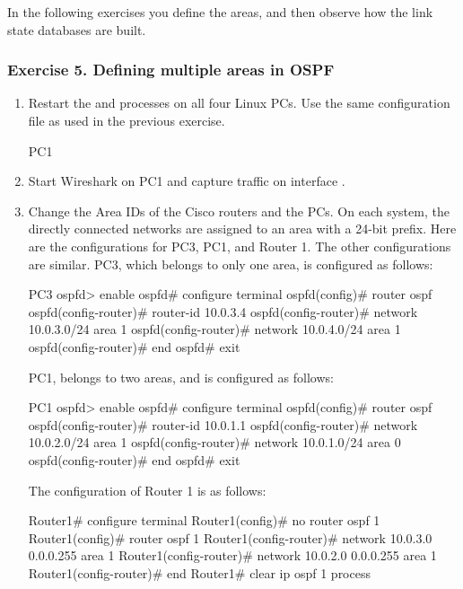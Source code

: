 In the following exercises you define the areas, and then observe how the link state databases are built.

\subsubsection*{Exercise 5. Defining multiple areas in OSPF}

\begin{enumerate}
	\item Restart the  and  processes on all four Linux PCs. Use the same  configuration file as used in the previous exercise.
		\begin{cmdblock}
	PC1%
		\end{cmdblock}
	\item Start Wireshark on PC1 and capture traffic on interface .
	\item Change the Area IDs of the Cisco routers and the PCs. On each system, the directly connected networks are assigned to an area with a 24-bit prefix. Here are the configurations for PC3, PC1, and Router 1. The other configurations are similar.
		PC3, which belongs to only one area, is configured as follows:
		\begin{cmdblock}
	PC3%
	ospfd> enable
	ospfd# configure terminal
	ospfd(config)# router ospf 
	ospfd(config-router)# router-id 10.0.3.4 
	ospfd(config-router)# network 10.0.3.0/24 area 1 
	ospfd(config-router)# network 10.0.4.0/24 area 1 
	ospfd(config-router)# end
	ospfd# exit
		\end{cmdblock}
		PC1, belongs to two areas, and is configured as follows:
		\begin{cmdblock}
	PC1%
	ospfd> enable
	ospfd# configure terminal
	ospfd(config)# router ospf 
	ospfd(config-router)# router-id 10.0.1.1 
	ospfd(config-router)# network 10.0.2.0/24 area 1 
	ospfd(config-router)# network 10.0.1.0/24 area 0 
	ospfd(config-router)# end
	ospfd# exit
		\end{cmdblock}
		The configuration of Router 1 is as follows:
		\begin{cmdblock}
	Router1# configure terminal
	Router1(config)# no router ospf 1
	Router1(config)# router ospf 1
	Router1(config-router)# network 10.0.3.0 0.0.0.255 area 1
	Router1(config-router)# network 10.0.2.0 0.0.0.255 area 1 
	Router1(config-router)# end
	Router1# clear ip ospf 1 process
		\end{cmdblock}

\end{enumerate}
